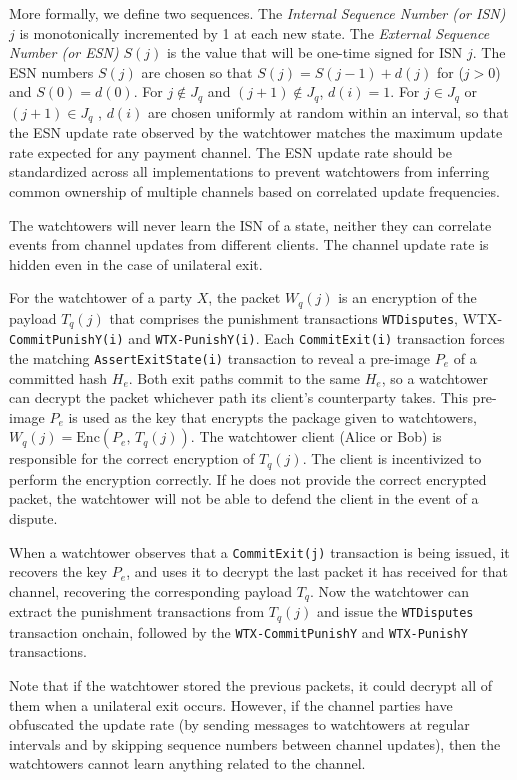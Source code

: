 \documentclass[11pt,a4paper]{article}
\newcommand{\txname}[1]{\texttt{#1}}
\begin{document}
More formally, we define two sequences. The \textit{Internal Sequence Number (or ISN)} $j$ is monotonically incremented by 1 at each new state. The \textit{External Sequence Number (or ESN)} $S(j)$ is the value that will be one-time signed for ISN $j$. The ESN numbers $S(j)$ are chosen so that $S(j) = S(j-1) + d(j)$ for ($j>0$) and $S(0) = d(0)$. For $j \notin J_q$ and $(j+1) \notin J_q$, $d(i)= 1$. For $j \in J_q$ or $(j+1) \in J_q$ , $d(i)$ are chosen uniformly at random within an interval, so that the ESN update rate observed by the watchtower matches the maximum update rate expected for any payment channel. The ESN update rate should be standardized across all implementations to prevent watchtowers from inferring common ownership of multiple channels based on correlated update frequencies.

The watchtowers will never learn the ISN of a state, neither they can correlate events from channel updates from different clients. The channel update rate is hidden even in the case of unilateral exit. 

For the watchtower of a party $X$, the packet $W_q(j)$ is an encryption of the payload $T_q(j)$ that comprises the punishment transactions \txname{WTDisputes}, WTX-\txname{CommitPunishY(i)} and \txname{WTX-PunishY(i)}. Each \txname{CommitExit(i)} transaction forces the matching \txname{AssertExitState(i)} transaction to reveal a pre-image $P_e$ of a committed hash $H_e$. Both exit paths commit to the same $H_e$, so a watchtower can decrypt the packet whichever path its client's counterparty takes. This pre-image $P_e$ is used as the key that encrypts the package given to watchtowers, $W_q(j) = \mathrm{Enc}(P_e,\, T_q(j))$.  The watchtower client (Alice or Bob) is responsible for the correct encryption of $T_q(j)$. The client is incentivized to perform the encryption correctly. If he does not provide the correct encrypted packet, the watchtower will not be able to defend the client in the event of a dispute. 

When a watchtower observes that a \txname{CommitExit(j)} transaction is being issued, it recovers the key $P_e$, and uses it to decrypt the last packet it has received for that channel, recovering the corresponding payload $T_q$. Now the watchtower can extract the punishment transactions from $T_q(j)$ and issue the \txname{WTDisputes} transaction onchain, followed by the \txname{WTX-CommitPunishY} and \txname{WTX-PunishY} transactions. 

Note that if the watchtower stored the previous packets, it could decrypt all of them when a unilateral exit occurs. However, if the channel parties have obfuscated the update rate (by sending messages to watchtowers at regular intervals and by skipping sequence numbers between channel updates), then the watchtowers cannot learn anything related to the channel. 
\end{document}
